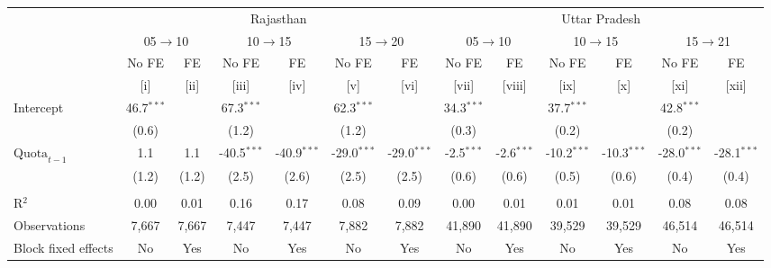 
\begingroup
\centering
\scriptsize
\begin{adjustbox}{max width=\linewidth}
   \begin{threeparttable}[b]
      \begin{tabular}{lcccccccccccc}
         \toprule
          & \multicolumn{6}{c}{Rajasthan} & \multicolumn{6}{c}{Uttar Pradesh} \\
          & \multicolumn{2}{c}{05$\rightarrow$10} & \multicolumn{2}{c}{10$\rightarrow$15} & \multicolumn{2}{c}{15$\rightarrow$20} & \multicolumn{2}{c}{05$\rightarrow$10} & \multicolumn{2}{c}{10$\rightarrow$15} & \multicolumn{2}{c}{15$\rightarrow$21} \\
                               & No FE        & FE    & No FE         & FE            & No FE         & FE            & No FE        & FE           & No FE         & FE            & No FE         & FE \\
                               & [i]          & [ii]  & [iii]         & [iv]          & [v]           & [vi]          & [vii]        & [viii]       & [ix]          & [x]           & [xi]          & [xii]\\
         \midrule
         Intercept             & 46.7$^{***}$ &       & 67.3$^{***}$  &               & 62.3$^{***}$  &               & 34.3$^{***}$ &              & 37.7$^{***}$  &               & 42.8$^{***}$  &   \\
                               & (0.6)        &       & (1.2)         &               & (1.2)         &               & (0.3)        &              & (0.2)         &               & (0.2)         &   \\
         $\text{Quota}_{t-1}$  & 1.1          & 1.1   & -40.5$^{***}$ & -40.9$^{***}$ & -29.0$^{***}$ & -29.0$^{***}$ & -2.5$^{***}$ & -2.6$^{***}$ & -10.2$^{***}$ & -10.3$^{***}$ & -28.0$^{***}$ & -28.1$^{***}$\\
                               & (1.2)        & (1.2) & (2.5)         & (2.6)         & (2.5)         & (2.5)         & (0.6)        & (0.6)        & (0.5)         & (0.6)         & (0.4)         & (0.4)\\
          \\
         R$^2$                 & 0.00         & 0.01  & 0.16          & 0.17          & 0.08          & 0.09          & 0.00         & 0.01         & 0.01          & 0.01          & 0.08          & 0.08\\
         Observations          & 7,667        & 7,667 & 7,447         & 7,447         & 7,882         & 7,882         & 41,890       & 41,890       & 39,529        & 39,529        & 46,514        & 46,514\\
         Block fixed effects   & No           & Yes   & No            & Yes           & No            & Yes           & No           & Yes          & No            & Yes           & No            & Yes\\
         \bottomrule
      \end{tabular}


\end{threeparttable}
\end{adjustbox}
